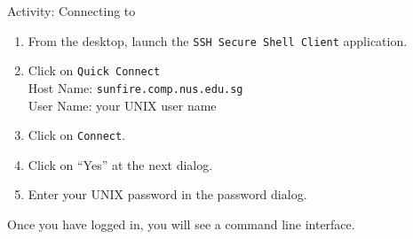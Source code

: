 \begin{frame}{Activity: Connecting to \sunfire}
\begin{enumerate}
\item From the desktop, launch the \texttt{SSH Secure Shell Client} application. 
\item Click on \texttt{Quick Connect}\\ 
Host Name: \texttt{sunfire.comp.nus.edu.sg}\\ 
User Name: your UNIX user name
\item Click on \texttt{Connect}.
\item Click on ``Yes'' at the next dialog.  
\item Enter your UNIX password in the password dialog.  
\end{enumerate}
\end{frame}

Once you have logged in, you will see a command line interface.   


